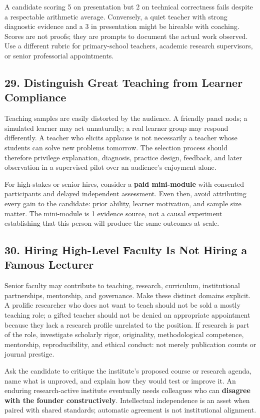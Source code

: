 A candidate scoring 5 on presentation but 2 on technical correctness fails despite a respectable arithmetic average. Conversely, a quiet teacher with strong diagnostic evidence and a 3 in presentation might be hireable with coaching. Scores are not proofs; they are prompts to document the actual work observed. Use a different rubric for primary-school teachers, academic research supervisors, or senior professorial appointments.

\subsection*{29. Distinguish Great Teaching from Learner Compliance}

Teaching samples are easily distorted by the audience. A friendly panel nods; a simulated learner may act unnaturally; a real learner group may respond differently. A teacher who elicits applause is not necessarily a teacher whose students can solve new problems tomorrow. The selection process should therefore privilege explanation, diagnosis, practice design, feedback, and later observation in a supervised pilot over an audience's enjoyment alone.

For high-stakes or senior hires, consider a \textbf{paid mini-module} with consented participants and delayed independent assessment. Even then, avoid attributing every gain to the candidate: prior ability, learner motivation, and sample size matter. The mini-module is 1 evidence source, not a causal experiment establishing that this person will produce the same outcomes at scale.

\subsection*{30. Hiring High-Level Faculty Is Not Hiring a Famous Lecturer}

Senior faculty may contribute to teaching, research, curriculum, institutional partnerships, mentorship, and governance. Make these distinct domains explicit. A prolific researcher who does not want to teach should not be sold a mostly teaching role; a gifted teacher should not be denied an appropriate appointment because they lack a research profile unrelated to the position. If research is part of the role, investigate scholarly rigor, originality, methodological competence, mentorship, reproducibility, and ethical conduct: not merely publication counts or journal prestige.

Ask the candidate to critique the institute's proposed course or research agenda, name what is unproved, and explain how they would test or improve it. An enduring research-active institute eventually needs colleagues who can \textbf{disagree with the founder constructively}. Intellectual independence is an asset when paired with shared standards; automatic agreement is not institutional alignment.

